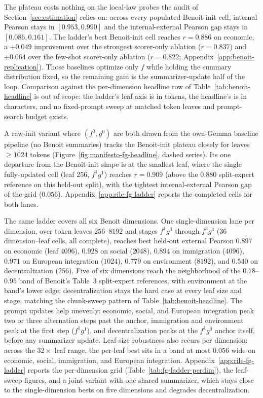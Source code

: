 The plateau costs nothing on the local-law probes the audit of
Section~\ref{sec:estimation} relies on: across every populated
Benoit-init cell, internal Pearson stays in $[0.953, 0.990]$ and the
internal-external Pearson gap stays in $[0.086, 0.161]$. The ladder's
best Benoit-init cell reaches $r = 0.886$ on economic, a $+0.049$
improvement over the strongest scorer-only ablation ($r = 0.837$) and
$+0.064$ over the few-shot scorer-only ablation ($r = 0.822$;
Appendix~\ref{app:benoit-replication}). Those baselines optimize only
$f$ while holding the summary distribution fixed, so the remaining gain
is the summarizer-update half of the loop. Comparison against the
per-dimension headline row of Table~\ref{tab:benoit-headline} is out
of scope: the ladder's leaf axis is in tokens, the headline's is in
characters, and no fixed-prompt sweep at matched token leaves and
prompt-search budget exists.

A raw-init variant where $(f^0, g^0)$ are both drawn from the
own-Gemma baseline pipeline (no Benoit summaries) tracks the
Benoit-init plateau closely for leaves $\geq 1024$ tokens
(Figure~\ref{fig:manifesto-fg-headline}, dashed series). Its one
departure from the Benoit-init shape is at the smallest leaf, where
the single fully-updated cell (leaf $256$, $f^1 g^1$) reaches
$r = 0.909$ (above the $0.880$ split-expert reference on this
held-out split), with the tightest internal-external Pearson gap
of the grid ($0.056$). Appendix~\ref{app:rile-fg-ladder} reports
the completed cells for both lanes.

The same ladder covers all six Benoit dimensions. One
single-dimension lane per dimension, over token leaves $256$--$8192$
and stages $f^1 g^0$ through $f^3 g^3$ ($36$ dimension--leaf cells,
all complete), reaches best held-out external Pearson $0.897$ on
economic (leaf $4096$), $0.928$ on social ($2048$), $0.894$ on
immigration ($4096$), $0.971$ on European integration ($1024$),
$0.779$ on environment ($8192$), and $0.540$ on decentralization
($256$). Five of six dimensions reach the neighborhood of the
$0.78$--$0.95$ band of Benoit's Table~3 split-expert references,
with environment at the band's lower edge;
decentralization stays the hard case at every leaf size and stage,
matching the chunk-sweep pattern of Table~\ref{tab:benoit-headline}.
The prompt updates help unevenly: economic, social, and European
integration peak two or three alternation steps past the anchor,
immigration and environment peak at the first step ($f^1 g^1$), and
decentralization peaks at the $f^1 g^0$ anchor itself, before any
summarizer update. Leaf-size robustness also recurs per dimension:
across the $32\times$ leaf range, the per-leaf best sits in a band
at most $0.056$ wide on economic, social, immigration, and European
integration. Appendix~\ref{app:rile-fg-ladder} reports the
per-dimension grid (Table~\ref{tab:fg-ladder-perdim}), the
leaf-sweep figures, and a joint variant with one shared summarizer,
which stays close to the single-dimension bests on five dimensions
and degrades decentralization.

